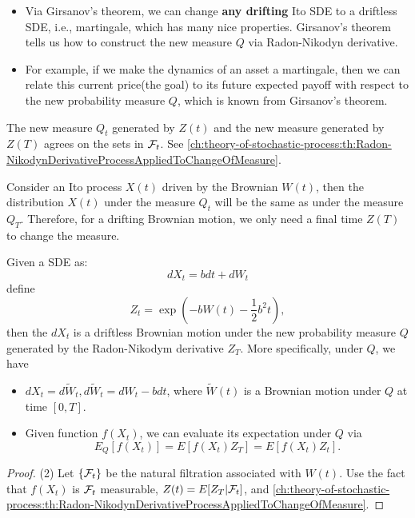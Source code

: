 \begin{refsection}
\begin{remark}[implications]\hfill
	\begin{itemize}
		\item Via Girsanov's theorem, we can change \textbf{any drifting }Ito SDE to a driftless SDE, i.e., martingale, which has many nice properties. Girsanov's theorem tells us how to construct the new measure $Q$ via Radon-Nikodyn derivative. 
		\item For example, if we make the dynamics of an asset a martingale, then we can relate this current price(the goal) to its future expected payoff with respect to the new probability measure $Q$, which is known from Girsanov's theorem. 
	\end{itemize}
\end{remark}

\begin{note}
	The new measure $Q_t$ generated by $Z(t)$ and the new measure generated by $Z(T)$ agrees on the sets in $\mathcal{F}_t$. See \autoref{ch:theory-of-stochastic-process:th:Radon-NikodynDerivativeProcessAppliedToChangeOfMeasure}.
	
	Consider an Ito process $X(t)$ driven by the Brownian $W(t)$, then the distribution $X(t)$ under the measure $Q_t$ will be the same as under the measure $Q_T$. Therefore, for a drifting Brownian motion, we only need a final time $Z(T)$ to change the measure.
\end{note}



\begin{corollary}
	\cite[155]{wiersema2008brownian}\cite[221]{steele2001stochastic}Given a SDE as:
	$$dX_t = bdt + dW_t$$
	define $$Z_t = \exp(-bW(t) - \frac{1}{2}b^2 t),$$ then the $dX_t$ is a driftless Brownian motion under the new probability measure $Q$ generated by the Radon-Nikodym derivative $Z_T$. More specifically, under $Q$, we have
	\begin{itemize}
		\item $dX_t = d\tilde{W}_t, d\tilde{W}_t = dW_t - bdt$, where $\tilde{W}(t)$ is a Brownian motion under $Q$ at time $[0,T]$.
		\item Given function $f(X_t)$, we can evaluate its expectation under $Q$ via $$E_Q[f(X_t)] = E[f(X_t)Z_T] = E[f(X_t)Z_t].$$
	\end{itemize}
\end{corollary}
\begin{proof}
	(2) Let $\{\mathcal{F}_t\}$ be the natural filtration associated with $W(t)$. Use the fact that $f(X_t)$ is $\mathcal{F}_t$ measurable, $Z(t) = E[Z_T|\mathcal{F}_t]$, and \autoref{ch:theory-of-stochastic-process:th:Radon-NikodynDerivativeProcessAppliedToChangeOfMeasure}. 	
\end{proof}





\end{refsection}
